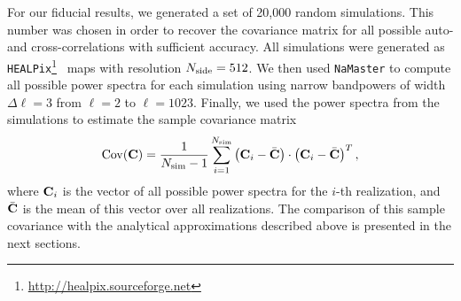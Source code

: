 \documentclass[a4paper,11pt]{article}
\begin{document}
      For our fiducial results, we generated a set of 20,000 random
      simulations. This number was chosen in order to recover the covariance
      matrix for all possible auto- and cross-correlations with sufficient
      accuracy. All simulations were generated as {\tt
        HEALPix}\footnote{\url{http://healpix.sourceforge.net}}~\cite{Gorski:2004by} maps with resolution $N_{\rm side}=512$. We then used {\tt NaMaster} to compute all possible power spectra for each simulation using narrow bandpowers of width $\Delta\ell=3$ from $\ell=2$ to $\ell=1023$. Finally, we used the power spectra from the simulations to estimate the sample covariance matrix
      \begin{equation}
        {\rm Cov}({\bf C}) =\frac{1}{N_{\rm sim}-1}\sum_{i=1}^{N_{\rm sim}}\left({\bf C}_i-\bar{\bf C}\right)\cdot\left({\bf C}_i-\bar{\bf C}\right)^T,
      \end{equation}
      where ${\bf C}_i$ is the vector of all possible power spectra for the $i$-th realization, and $\bar{\bf C}$ is the mean of this vector over all realizations. The comparison of this sample covariance with the analytical approximations described above is presented in the next sections.
\end{document}
